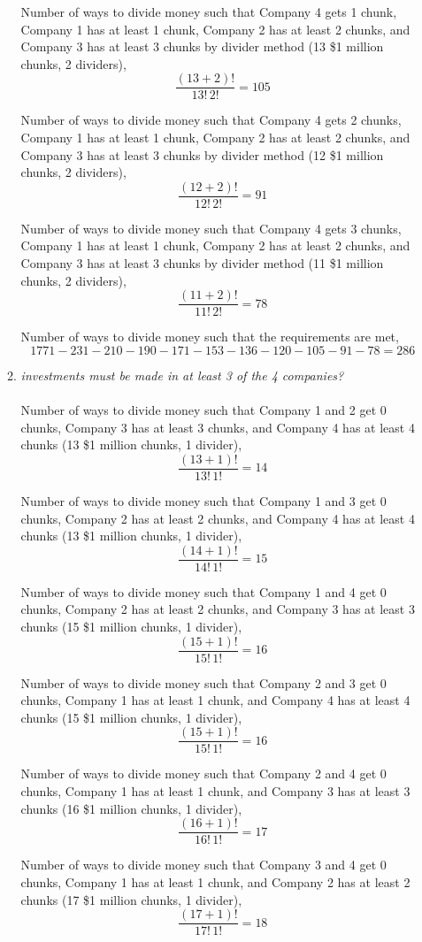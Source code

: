 \documentclass{article} %
\begin{document}
\begin{enumerate}
\begin{enumerate}
		Number of ways to divide money such that Company 4 gets 1 chunk, Company 1 has at least 1 chunk, Company 2 has at least 2 chunks, and Company 3 has at least 3 chunks by divider method (13 \$1 million chunks, 2 dividers), $$\frac{(13 + 2)!}{13!\,2!} = 105$$
		
		Number of ways to divide money such that Company 4 gets 2 chunks, Company 1 has at least 1 chunk, Company 2 has at least 2 chunks, and Company 3 has at least 3 chunks by divider method (12 \$1 million chunks, 2 dividers), $$\frac{(12 + 2)!}{12!\,2!} = 91$$
		
		Number of ways to divide money such that Company 4 gets 3 chunks, Company 1 has at least 1 chunk, Company 2 has at least 2 chunks, and Company 3 has at least 3 chunks by divider method (11 \$1 million chunks, 2 dividers), $$\frac{(11 + 2)!}{11!\,2!} = 78$$
		
		Number of ways to divide money such that the requirements are met, $$1771 - 231 - 210 - 190 - 171 - 153 - 136 - 120 - 105 - 91 - 78 = 286$$
		
		\item \textit{investments must be made in at least 3 of the 4 companies?}\\
		\\
		Number of ways to divide money such that Company 1 and 2 get 0 chunks, Company 3 has at least 3 chunks, and Company 4 has at least 4 chunks (13 \$1 million chunks, 1 divider), $$\frac{(13 + 1)!}{13!\,1!} = 14$$
		
		Number of ways to divide money such that Company 1 and 3 get 0 chunks, Company 2 has at least 2 chunks, and Company 4 has at least 4 chunks (13 \$1 million chunks, 1 divider), $$\frac{(14 + 1)!}{14!\,1!} = 15$$
		
		Number of ways to divide money such that Company 1 and 4 get 0 chunks, Company 2 has at least 2 chunks, and Company 3 has at least 3 chunks (15 \$1 million chunks, 1 divider), $$\frac{(15 + 1)!}{15!\,1!} = 16$$
		
		Number of ways to divide money such that Company 2 and 3 get 0 chunks, Company 1 has at least 1 chunk, and Company 4 has at least 4 chunks (15 \$1 million chunks, 1 divider), $$\frac{(15 + 1)!}{15!\,1!} = 16$$
		
		Number of ways to divide money such that Company 2 and 4 get 0 chunks, Company 1 has at least 1 chunk, and Company 3 has at least 3 chunks (16 \$1 million chunks, 1 divider), $$\frac{(16 + 1)!}{16!\,1!} = 17$$
		
		Number of ways to divide money such that Company 3 and 4 get 0 chunks, Company 1 has at least 1 chunk, and Company 2 has at least 2 chunks (17 \$1 million chunks, 1 divider), $$\frac{(17 + 1)!}{17!\,1!} = 18$$


\end{enumerate}
\end{enumerate}
\end{document}
